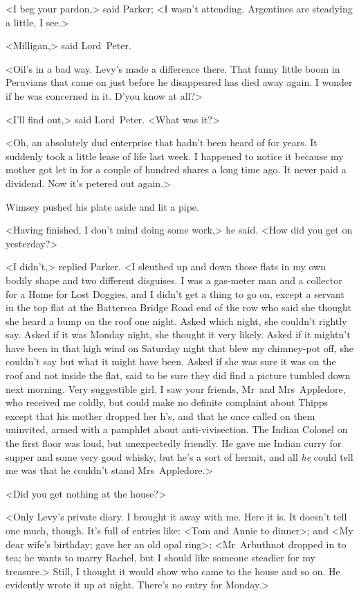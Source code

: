 <I beg your pardon,> said Parker; <I wasn't attending. Argentines are steadying a little, I see.>

<Milligan,> said Lord~Peter.

<Oil's in a bad way. Levy's made a difference there. That funny little boom in Peruvians that came on just before he disappeared has died away again. I wonder if he was concerned in it. D'you know at all?>

<I'll find out,> said Lord~Peter. <What was it?>

<Oh, an absolutely dud enterprise that hadn't been heard of for years. It suddenly took a little lease of life last week. I happened to notice it because my mother got let in for a couple of hundred shares a long time ago. It never paid a dividend. Now it's petered out again.>

Wimsey pushed his plate aside and lit a pipe.

<Having finished, I don't mind doing some work,> he said. <How did you get on yesterday?>

<I didn't,> replied Parker. <I sleuthed up and down those flats in my own bodily shape and two different disguises. I was a gas-meter man and a collector for a Home for Lost Doggies, and I didn't get a thing to go on, except a servant in the top flat at the Battersea Bridge Road end of the row who said she thought she heard a bump on the roof one night. Asked which night, she couldn't rightly say. Asked if it was Monday night, she thought it very likely. Asked if it mightn't have been in that high wind on Saturday night that blew my chimney-pot off, she couldn't say but what it might have been. Asked if she was sure it was on the roof and not inside the flat, said to be sure they did find a picture tumbled down next morning. Very suggestible girl. I saw your friends, Mr~and Mrs~Appledore, who received me coldly, but could make no definite complaint about Thipps except that his mother dropped her h's, and that he once called on them uninvited, armed with a pamphlet about anti-vivisection. The Indian Colonel on the first floor was loud, but unexpectedly friendly. He gave me Indian curry for supper and some very good whisky, but he's a sort of hermit, and all \textit{he} could tell me was that he couldn't stand Mrs~Appledore.>

<Did you get nothing at the house?>

<Only Levy's private diary. I brought it away with me. Here it is. It doesn't tell one much, though. It's full of entries like: <Tom and Annie to dinner>; and <My dear wife's birthday; gave her an old opal ring>; <Mr~Arbuthnot dropped in to tea; he wants to marry Rachel, but I should like someone steadier for my treasure.> Still, I thought it would show who came to the house and so on. He evidently wrote it up at night. There's no entry for Monday.>

